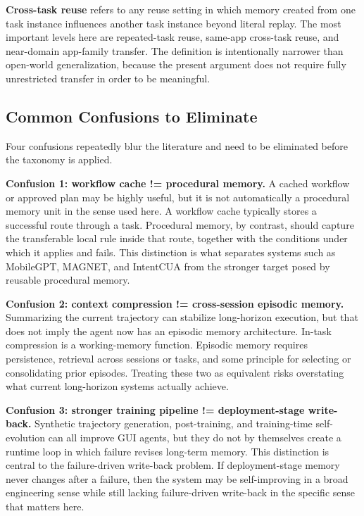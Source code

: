 \documentclass{article}
\begin{document}
\textbf{Cross-task reuse} refers to any reuse setting in which memory
created from one task instance influences another task instance beyond
literal replay. The most important levels here are repeated-task reuse,
same-app cross-task reuse, and near-domain app-family transfer. The
definition is intentionally narrower than open-world generalization,
because the present argument does not require fully unrestricted
transfer in order to be meaningful.

\subsection{Common Confusions to Eliminate}\label{33-common-confusions-to-eliminate}

Four confusions repeatedly blur the literature and need to be eliminated
before the taxonomy is applied.

\textbf{Confusion 1: workflow cache != procedural memory.} A cached
workflow or approved plan may be highly useful, but it is not
automatically a procedural memory unit in the sense used here. A
workflow cache typically stores a successful route through a task.
Procedural memory, by contrast, should capture the transferable local
rule inside that route, together with the conditions under which it
applies and fails. This distinction is what separates systems such as
MobileGPT, MAGNET, and IntentCUA from the stronger target posed by
reusable procedural memory.

\textbf{Confusion 2: context compression != cross-session episodic
memory.} Summarizing the current trajectory can stabilize long-horizon
execution, but that does not imply the agent now has an episodic memory
architecture. In-task compression is a working-memory function. Episodic
memory requires persistence, retrieval across sessions or tasks, and
some principle for selecting or consolidating prior episodes. Treating
these two as equivalent risks overstating what current long-horizon
systems actually achieve.

\textbf{Confusion 3: stronger training pipeline != deployment-stage
write-back.} Synthetic trajectory generation, post-training, and
training-time self-evolution can all improve GUI agents, but they do not
by themselves create a runtime loop in which failure revises long-term
memory. This distinction is central to the failure-driven write-back
problem. If deployment-stage memory never changes after a failure, then
the system may be self-improving in a broad engineering sense while
still lacking failure-driven write-back in the specific sense that
matters here.
\end{document}
